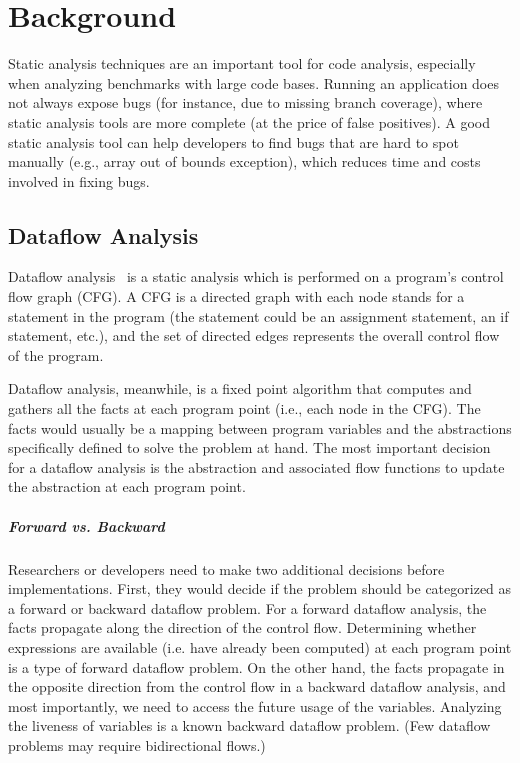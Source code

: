\chapter{Background}
\label{chap:background}

Static analysis techniques are an important tool for code analysis, especially when analyzing benchmarks with large code bases. Running an application does not always expose bugs (for instance, due to missing branch coverage), where static analysis tools are more complete (at the price of false positives). A good static analysis tool can help developers to find bugs that are hard to spot manually (e.g., array out of bounds exception), which reduces time and costs involved in fixing bugs. 

\section{Dataflow Analysis}

Dataflow analysis~\cite{kildall73:_unified_approac_global_progr_optim} is a static analysis which is performed on a program's control flow graph (CFG). A CFG is a directed graph with each node stands for a statement in the program (the statement could be an assignment statement, an if statement, etc.), and the set of directed edges represents the overall control flow of the program.

Dataflow analysis, meanwhile, is a fixed point algorithm that computes and gathers all the facts at each program point (i.e., each node in the CFG). The facts would usually be a mapping between program variables and the abstractions specifically defined to solve the problem at hand. The most important decision for a dataflow analysis is the abstraction and associated flow functions to update the abstraction at each program point.

\paragraph{Forward vs. Backward} Researchers or developers need to make two additional decisions before implementations. First, they would decide if the problem should be categorized as a forward or backward dataflow problem. For a forward dataflow analysis, the facts propagate along the direction of the control flow. Determining whether expressions are available (i.e. have already been computed) at each program point is a type of forward dataflow problem. On the other hand, the facts propagate in the opposite direction from the control flow in a backward dataflow analysis, and most importantly, we need to access the future usage of the variables. Analyzing the liveness of variables is a known backward dataflow problem. (Few dataflow problems may require bidirectional flows.)

